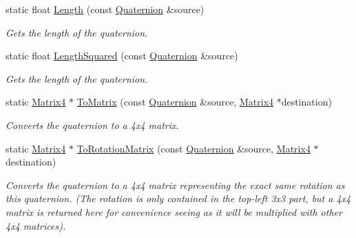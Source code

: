 \begin{DoxyCompactItemize}
static float \hyperlink{class_flounder_1_1_quaternion_a7b2f59b6aa9c88b3c8b6cf88999053b0}{Length} (const \hyperlink{class_flounder_1_1_quaternion}{Quaternion} \&source)
\begin{DoxyCompactList}\small\item\em Gets the length of the quaternion. \end{DoxyCompactList}\item 
static float \hyperlink{class_flounder_1_1_quaternion_a84c494c718ef878c45ec14c9790ba49d}{Length\+Squared} (const \hyperlink{class_flounder_1_1_quaternion}{Quaternion} \&source)
\begin{DoxyCompactList}\small\item\em Gets the length of the quaternion. \end{DoxyCompactList}\item 
static \hyperlink{class_flounder_1_1_matrix4}{Matrix4} $\ast$ \hyperlink{class_flounder_1_1_quaternion_aa55f078feeb6fea281b4791fa6ec6fcf}{To\+Matrix} (const \hyperlink{class_flounder_1_1_quaternion}{Quaternion} \&source, \hyperlink{class_flounder_1_1_matrix4}{Matrix4} $\ast$destination)
\begin{DoxyCompactList}\small\item\em Converts the quaternion to a 4x4 matrix. \end{DoxyCompactList}\item 
static \hyperlink{class_flounder_1_1_matrix4}{Matrix4} $\ast$ \hyperlink{class_flounder_1_1_quaternion_a5fd9b9cb5501a1478ed7f640faae3b92}{To\+Rotation\+Matrix} (const \hyperlink{class_flounder_1_1_quaternion}{Quaternion} \&source, \hyperlink{class_flounder_1_1_matrix4}{Matrix4} $\ast$destination)
\begin{DoxyCompactList}\small\item\em Converts the quaternion to a 4x4 matrix representing the exact same rotation as this quaternion. (The rotation is only contained in the top-\/left 3x3 part, but a 4x4 matrix is returned here for convenience seeing as it will be multiplied with other 4x4 matrices). \end{DoxyCompactList}\end{DoxyCompactItemize}
